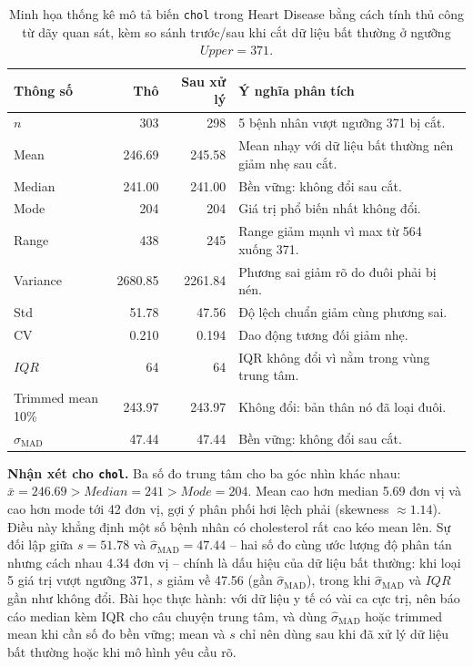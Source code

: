 \begin{table}[H]
\centering
\caption[Minh họa thống kê mô tả biến \texttt{chol} Heart Disease]{Minh họa thống kê mô tả biến \texttt{chol} trong Heart Disease bằng cách tính thủ công từ dãy quan sát, kèm so sánh trước/sau khi cắt dữ liệu bất thường ở ngưỡng $Upper=371$.}
\label{tab:chapter1_chol_detailed_stats}
\small
\begin{tabular}{lrrp{}}
\toprule
Thông số & Thô & Sau xử lý & Ý nghĩa phân tích \\
\midrule
$n$ & 303 & 298 & 5 bệnh nhân vượt ngưỡng 371 bị cắt. \\
Mean & 246.69 & 245.58 & Mean nhạy với dữ liệu bất thường nên giảm nhẹ sau cắt. \\
Median & 241.00 & 241.00 & Bền vững: không đổi sau cắt. \\
Mode & 204 & 204 & Giá trị phổ biến nhất không đổi. \\
Range & 438 & 245 & Range giảm mạnh vì max từ 564 xuống 371. \\
Variance & 2680.85 & 2261.84 & Phương sai giảm rõ do đuôi phải bị nén. \\
Std & 51.78 & 47.56 & Độ lệch chuẩn giảm cùng phương sai. \\
CV & 0.210 & 0.194 & Dao động tương đối giảm nhẹ. \\
$IQR$ & 64 & 64 & IQR không đổi vì nằm trong vùng trung tâm. \\
Trimmed mean 10\% & 243.97 & 243.97 & Không đổi: bản thân nó đã loại đuôi. \\
$\hat{\sigma}_{\text{MAD}}$ & 47.44 & 47.44 & Bền vững: không đổi sau cắt. \\
\bottomrule
\end{tabular}
\end{table}

\textbf{Nhận xét cho \texttt{chol}.} Ba số đo trung tâm cho ba góc nhìn khác nhau: $\bar{x}=246.69 > Median=241 > Mode=204$. Mean cao hơn median 5.69 đơn vị và cao hơn mode tới 42 đơn vị, gợi ý phân phối hơi lệch phải (skewness $\approx 1.14$). Điều này khẳng định một số bệnh nhân có cholesterol rất cao kéo mean lên. Sự đối lập giữa $s=51.78$ và $\hat{\sigma}_{\text{MAD}}=47.44$ -- hai số đo cùng ước lượng độ phân tán nhưng cách nhau 4.34 đơn vị -- chính là dấu hiệu của dữ liệu bất thường: khi loại 5 giá trị vượt ngưỡng 371, $s$ giảm về 47.56 (gần $\hat{\sigma}_{\text{MAD}}$), trong khi $\hat{\sigma}_{\text{MAD}}$ và $IQR$ gần như không đổi. Bài học thực hành: với dữ liệu y tế có vài ca cực trị, nên báo cáo median kèm IQR cho câu chuyện trung tâm, và dùng $\hat{\sigma}_{\text{MAD}}$ hoặc trimmed mean khi cần số đo bền vững; mean và $s$ chỉ nên dùng sau khi đã xử lý dữ liệu bất thường hoặc khi mô hình yêu cầu rõ.

